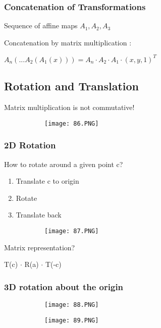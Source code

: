 \documentclass{article}
\begin{document}
\subsubsection{Concatenation of Transformations}

Sequence of affine maps $A_1,A_2,A_3$

Concatenation by matrix multiplication : 

$A_n(...A_2(A_1(x))) = A_n \cdot A_2 \cdot A_1 \cdot (x,y,1)^T$

\subsection{Rotation and Translation}

Matrix multiplication is not commutative!


\begin{figure}[ht!]
  \centering
  \begin{subfigure}[b]{0.5\linewidth}
    \texttt{[image: 86.PNG]}
  \end{subfigure}
\end{figure}

\subsubsection{2D Rotation}

How to rotate around a given point c?

\begin{enumerate}
    \item Translate c to origin
    \item Rotate 
    \item Translate back
\end{enumerate}

\begin{figure}[ht!]
  \centering
  \begin{subfigure}[b]{0.5\linewidth}
    \texttt{[image: 87.PNG]}
  \end{subfigure}
\end{figure}

Matrix representation? 

T(c) $\cdot$ R(a) $\cdot$ T(-c)

\subsubsection{3D rotation about the origin}

\begin{figure}[ht!]
  \centering
  \begin{subfigure}[b]{0.49\linewidth}
    \texttt{[image: 88.PNG]}
  \end{subfigure}
  \begin{subfigure}[b]{0.5\textwidth}
         \centering
         \texttt{[image: 89.PNG]}
     \end{subfigure}
\end{figure}
\end{document}

